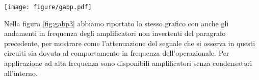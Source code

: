 \begin{SCfigure*}
    \texttt{[image: figure/gabp.pdf]}
    \caption{Nel grafico sono visibili gli stessi dati delle figure \ref{fig:freq_ris3} e \ref{fig:A_vs_freq3}, solo che sono
        mostrati assieme. Come si vede è proprio a causa dell'andamento del guadagno in frequenza dell'opamp che
        questi circuiti hanno una frequenza di taglio ed una riduzione del guadagno.}
    \label{fig:gabp3}
\end{SCfigure*}

Nella figura \ref{fig:gabp3} abbiamo riportato lo stesso grafico con anche gli andamenti in frequenza degli amplificatori
non invertenti del paragrafo precedente, per mostrare come l'attenuazione del segnale che si osserva in questi circuiti
sia dovuta al comportamento in frequenza dell'operazionale. Per applicazione ad alta frequenza sono disponibili
amplificatori senza condensatori all'interno.
